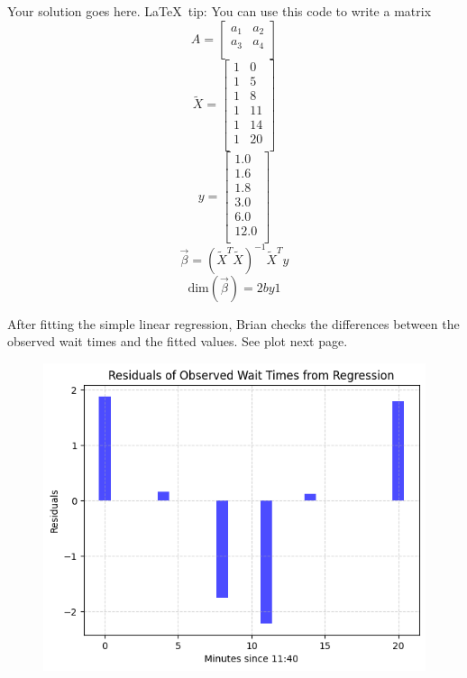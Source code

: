 \documentclass[11pt,addpoints,answers]{exam}
\begin{document}
\begin{questions}
\begin{parts}
  \begin{solutionorbox}[2in]
    Your solution goes here.  \LaTeX\ tip: You can use this code to write a matrix
    \begin{equation}
      A = \begin{bmatrix} 
        a_1 & a_2 \\ 
        a_3 & a_4 \\ 
    \end{bmatrix}  
  \end{equation}
  \begin{equation}
    \tilde{X}=\begin{bmatrix} 
      1 & 0 \\ 
      1 & 5 \\ 
      1 & 8 \\ 
      1 & 11 \\ 
      1 & 14 \\ 
      1 & 20 \\ 
    \end{bmatrix}
  \end{equation}
  \begin{equation}
    y=\begin{bmatrix}
      1.0 \\
      1.6 \\
      1.8 \\
      3.0 \\
      6.0 \\
      12.0 \\
    \end{bmatrix}
  \end{equation}
  \[ \vec{\beta} = (\tilde{X}^T\tilde{X})^{-1}\tilde{X}^Ty \]
  \[ \text{dim}(\vec{\beta}) = 2 by 1 \]
  \end{solutionorbox}

  \newpage
After fitting the simple linear regression, Brian checks the differences between the observed wait times and the fitted values. See plot next page.

\begin{figure}[!h]
    \centering
    \includegraphics[width=0.65\linewidth]{figure_2.png}
    \label{fig:residuals}
\end{figure}


\end{parts}
\end{questions}
\end{document}
